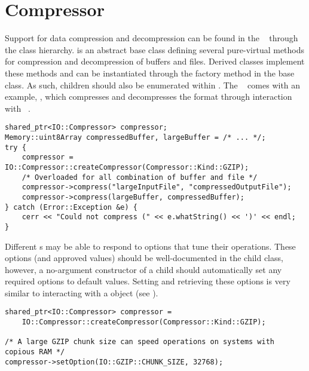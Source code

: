 \section{Compressor}
\label{sec-compressor}

Support for data compression and decompression can be found in the
\lname~ through the  class hierarchy.   is
an abstract base class defining several pure-virtual methods for compression
and decompression of buffers and files.  Derived classes implement these methods
and can be instantiated through the factory method in the base class.
As such, children should also be enumerated within . 
The \lname~ comes with an example, , which compresses and
decompresses the  format through interaction with
~\cite{zlib}.

\begin{lstlisting}[caption={Using a \class{Compressor} Object}, label=lst:compressoruse]
shared_ptr<IO::Compressor> compressor;
Memory::uint8Array compressedBuffer, largeBuffer = /* ... */;
try {
	compressor = IO::Compressor::createCompressor(Compressor::Kind::GZIP);
	/* Overloaded for all combination of buffer and file */
	compressor->compress("largeInputFile", "compressedOutputFile");
	compressor->compress(largeBuffer, compressedBuffer);
} catch (Error::Exception &e) {
	cerr << "Could not compress (" << e.whatString() << ')' << endl;
}
\end{lstlisting}

Different s may be able to respond to options that tune their
operations.  These options (and approved values) should be well-documented
in the child class, however, a no-argument constructor of a child
 should automatically set any required options to default
values.  Setting and retrieving these options is very similar to interacting
with a  object (see ).

\begin{lstlisting}[caption={Setting \class{Compressor} Options}, label=lst:compressoroptions]
shared_ptr<IO::Compressor> compressor =
    IO::Compressor::createCompressor(Compressor::Kind::GZIP);

/* A large GZIP chunk size can speed operations on systems with copious RAM */
compressor->setOption(IO::GZIP::CHUNK_SIZE, 32768);

\end{lstlisting}
